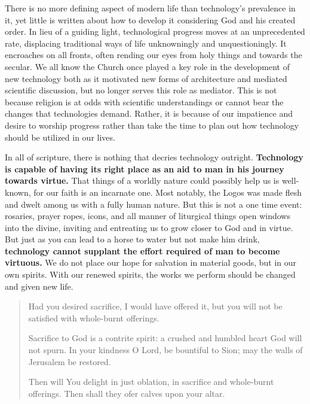 \documentclass[letterpaper]{article}
\begin{document}
  There is no more defining aspect of modern life than technology's prevalence in it, yet little is written about how to develop it considering God and his created order. In lieu of a guiding light, technological progress moves at an unprecedented rate, displacing traditional ways of life unknowningly and unquestioningly. It encroaches on all fronts, often rending our eyes from holy things and towards the secular. We all know the Church once played a key role in the development of new technology both as it motivated new forms of architecture and mediated scientific discussion, but no longer serves this role as mediator. This is not because religion is at odds with scientific understandings or cannot bear the changes that technologies demand. Rather, it is because of our impatience and desire to worship progress rather than take the time to plan out how technology should be utilized in our lives.


  In all of scripture, there is nothing that decries technology outright. \textbf{Technology is capable of having its right place as an aid to man in his journey towards virtue.} That things of a worldly nature could possibly help us is well-known, for our faith is an incarnate one. Most notably, the Logos was made flesh and dwelt among us with a fully human nature. But this is not a one time event: rosaries, prayer ropes, icons, and all manner of liturgical things open windows into the divine, inviting and entreating us to grow closer to God and in virtue. But just as you can lead to a horse to water but not make him drink, \textbf{technology cannot supplant the effort required of man to become virtuous.} We do not place our hope for salvation in material goods, but in our own spirits. With our renewed spirits, the works we perform should be changed and given new life.

  \begin{quote}
    Had you desired sacrifice, I would have offered it,
    but you will not be satisfied with whole-burnt offerings.

    Sacrifice to God is a contrite spirit:
    a crushed and humbled heart God will not spurn.
    In your kindness O Lord, be bountiful to Sion;
    may the walls of Jerusalem be restored.

    Then will You delight in just oblation,
    in sacrifice and whole-burnt offerings.
    Then shall they ofer calves upon your altar.
  \end{quote}
\end{document}
